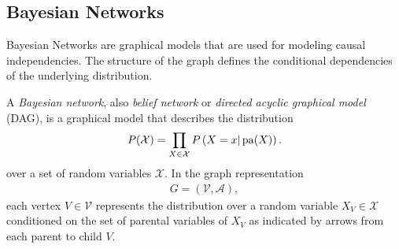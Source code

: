 \subsection{Bayesian Networks}
\label{subsec:gm-bayesian-net}

Bayesian Networks are graphical models that are used for modeling causal independencies. The
structure of the graph defines the conditional dependencies of the underlying distribution.

\begin{mydef}
    A \emph{Bayesian network}, also \emph{belief network} or \emph{directed acyclic graphical model}
    (DAG), is a graphical model that describes the distribution
    \begin{align}
        \label{eq:gm-bayesian-net}
        P(\mathcal{X}) = \prod_{X \in \mathcal{X}}P\left(X=x|\operatorname{pa}(X)\right).
    \end{align}
    over a set of random variables $\mathcal{X}$. In the graph representation
    \begin{align}
        G = (\mathcal{V}, \mathcal{A}),
    \end{align}
    each vertex $V \in \mathcal{V}$ represents the distribution over a random variable $X_V \in
    \mathcal{X}$ conditioned on the set of parental variables of $X_V$ as indicated by arrows from
    each parent to child $V$.
\end{mydef}

